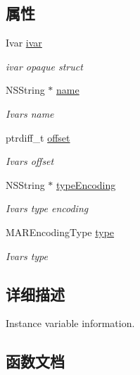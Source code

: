 \subsection*{属性}
\begin{DoxyCompactItemize}
\item 
Ivar \hyperlink{interface_m_a_r_class_ivar_info_ad031431aecc2ca5dee53fbf9e23579ad}{ivar}
\begin{DoxyCompactList}\small\item\em ivar opaque struct \end{DoxyCompactList}\item 
N\+S\+String $\ast$ \hyperlink{interface_m_a_r_class_ivar_info_a46f18b089d378603112075f99780ac57}{name}
\begin{DoxyCompactList}\small\item\em Ivar\textquotesingle{}s name \end{DoxyCompactList}\item 
ptrdiff\+\_\+t \hyperlink{interface_m_a_r_class_ivar_info_a181ae086100ace7ca21c5b2fad8cc8b7}{offset}
\begin{DoxyCompactList}\small\item\em Ivar\textquotesingle{}s offset \end{DoxyCompactList}\item 
N\+S\+String $\ast$ \hyperlink{interface_m_a_r_class_ivar_info_ac5db93a1bc10ac715e4feb6527c981ad}{type\+Encoding}
\begin{DoxyCompactList}\small\item\em Ivar\textquotesingle{}s type encoding \end{DoxyCompactList}\item 
M\+A\+R\+Encoding\+Type \hyperlink{interface_m_a_r_class_ivar_info_a1f17f61bd7ecfeeb0d582222133e8ba1}{type}
\begin{DoxyCompactList}\small\item\em Ivar\textquotesingle{}s type \end{DoxyCompactList}\end{DoxyCompactItemize}


\subsection{详细描述}
Instance variable information. 

\subsection{函数文档}
\mbox{\label{interface_m_a_r_class_ivar_info_a44696dac61d9c0b319f3e1579c1cae6c}} 
